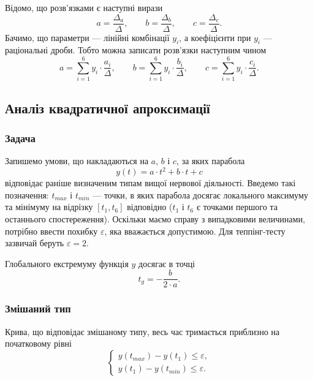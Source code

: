 Відомо, що розв’язками є наступні вирази
\begin{equation*}
  a = \frac{\Delta_a}{\Delta},\qquad
  b = \frac{\Delta_b}{\Delta},\qquad
  c = \frac{\Delta_c}{\Delta}.
\end{equation*}
Бачимо, що параметри --- лінійні комбінації $y_i$, а коефіцієнти при $y_i$ ---
раціональні дроби.
Тобто можна записати розв’язки наступним чином
\begin{equation*}
  a = \sum_{i=1}^{6} y_i \cdot \frac{a_i}{\Delta},\qquad
  b = \sum_{i=1}^{6} y_i \cdot \frac{b_i}{\Delta},\qquad
  c = \sum_{i=1}^{6} y_i \cdot \frac{c_i}{\Delta}.
\end{equation*}

\subsection{Аналіз квадратичної апроксимації}

\subsubsection{Задача}
Запишемо умови, що накладаються на $a$, $b$ і $c$, за яких парабола
\begin{equation*}
  y\left( t \right) = a \cdot t^2 + b \cdot t + c
\end{equation*}
відповідає раніше визначеним типам вищої нервової діяльності.
Введемо такі позначення: $t_{max}$ і $t_{min}$ --- точки, в яких парабола
досягає локального максимуму та мінімуму на відрізку $\left[ t_1, t_6 \right]$
відповідно ($t_1$ і $t_6$ є точками першого та останнього спостереження).
Оскільки маємо справу з випадковими величинами, потрібно ввести похибку
$\varepsilon$, яка вважається допустимою.
Для теппінг-тесту зазвичай беруть $\varepsilon = 2$. \cite{Ilin:2001}

Глобального екстремуму функція $y$ досягає в точці
\begin{equation*}
  t_g = - \frac{b}{2 \cdot a}.
\end{equation*}

\subsubsection{Змішаний тип}
Крива, що відповідає змішаному типу, весь час тримається приблизно на
початковому рівні
\begin{equation*}
  \begin{cases}
    y\left( t_{max} \right) - y\left( t_1 \right) \le \varepsilon, \\
    y\left( t_1 \right) - y\left( t_{min} \right) \le \varepsilon.
  \end{cases}
\end{equation*}

